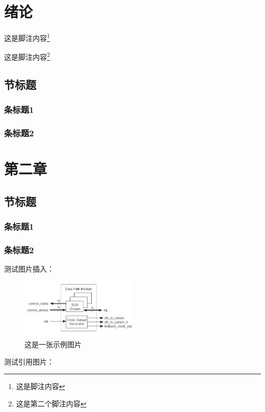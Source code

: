 \section{绪论}
\zhlipsum[3] 

这是脚注内容\footnote{这是脚注内容}

这是脚注内容\footnote{这是第二个脚注内容}
\subsection{节标题}
\zhlipsum[4]
\subsubsection{条标题1}
\zhlipsum[1-2]
\subsubsection{条标题2}
\zhlipsum[1-2]

\clearpage

\section{第二章}
\subsection{节标题}
\zhlipsum[2]
\subsubsection{条标题1}
\zhlipsum[6]
\subsubsection{条标题2}
\zhlipsum[7]

测试图片插入：
\begin{figure}[htbp]
  \centering
  \includegraphics[width=0.5\textwidth]{Figure/数据通道模块内部结构.png}
  \caption{这是一张示例图片}
  \label{fig:example-image}
\end{figure}

测试引用图片：

